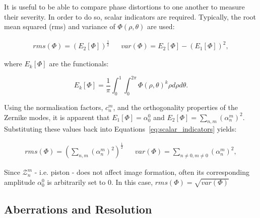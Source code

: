 It is useful to be able to compare phase distortions to one another to
measure their severity. In order to do so, scalar indicators are required.
Typically, the root mean squared (rms) and variance of $\Phi\left(\rho,\theta\right)$
are used:

\begin{align}\label{eq:scalar_indicators}
rms(\Phi) = \left(E_{2}\left[\Phi\right]\right)^{\frac{1}{2}} && 
var(\Phi) = E_{2}\left[\Phi\right] - \left(E_{1}\left[\Phi\right]\right)^{2},
\end{align}

where $E_{k}\left[\Phi\right]$ are the 
functionals\cite{antonello2014optimisation,mahajan1994zernike}:

\begin{equation}\label{eq:E_functionals}
E_{k}\left[\Phi\right] = \frac{1}{\pi} \int_{0}^{1}\int_{0}^{2\pi} \Phi\left(\rho,\theta\right)^{k}\rho d\rho d\theta.
\end{equation}

Using the normalisation factors, $c_{n}^{m}$, and the orthogonality
properties of the Zernike modes, it is apparent that $E_{1}\left[\Phi\right] 
= \alpha_{0}^{0}$ and $E_{2}\left[\Phi\right] = 
\sum\limits_{n,m}{\left({\alpha_{n}^{m}}\right)^{2}}$. Substituting 
these values back into Equations~\ref{eq:scalar_indicators} yields:

\begin{align}\label{eq:scalar_indicators_new}
rms(\Phi) = \left(\sum\limits_{n,m}{\left({\alpha_{n}^{m}}\right)^{2}}\right)^{\frac{1}{2}} && 
var(\Phi) = \sum\limits_{n\ne 0,m\ne 0}{\left({\alpha_{n}^{m}}\right)^{2}},
\end{align}

Since $\mathcal{Z}_{n}^{m}$ - i.e. piston - does not affect image 
formation, often its corresponding amplitude $\alpha_{0}^{0}$ is
arbitrarily set to $0$. In this case, $rms(\Phi) = \sqrt{var(\Phi)}$

\subsection{Aberrations and Resolution}
\label{subsec:aberrations_and_resolution}

